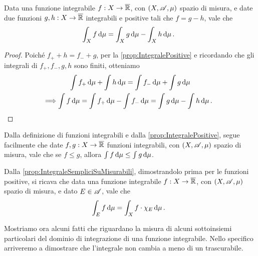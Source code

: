 \begin{lemma}\label{lemma:DefinizioneEquivalenteIntegraleIntegrabili}
	Data una funzione integrabile $f:X\to\overline{\mathbb R}$, con $(X,\mathscr A,\mu)$ spazio di misura, e date due funzioni $g,h:X\to \overline{\mathbb R}$ integrabili e positive tali che $f=g-h$, vale che
	\begin{equation*}
		\int_X f\,\mathrm d\mu=\int_Xg\,\mathrm d\mu-\int_Xh\,\mathrm d\mu\, \text{. }
	\end{equation*}
\end{lemma}
\begin{proof}
	Poiché $f_++h=f_-+g$, per la \cref{prop:IntegralePositive} e ricordando che gli integrali di $f_+,f_-,g,h$ sono finiti, otteniamo
	\begin{gather*}
		\int  f_+\,\mathrm d\mu+\int  h\,\mathrm d\mu=\int  f_-\,\mathrm d\mu+\int  g\,\mathrm d\mu \\
		\Longrightarrow \int f\,\mathrm d\mu=\int f_+\,\mathrm d\mu-\int f_-\,\mathrm d\mu=\int g\,\mathrm d\mu-\int h\,\mathrm d\mu\, \text{. }
	\end{gather*}
\end{proof}



\begin{remark}\label{nota:MonotoniaIntegraleIntegrabili}
	Dalla definizione di funzioni integrabili e dalla \cref{prop:IntegralePositive}, segue facilmente che date $f,g:X\to\overline{\mathbb R}$ funzioni integrabili, con $(X,\mathscr A,\mu)$ spazio di misura, vale che se $f\le g$, allora $\int f\,\mathrm d\mu\le \int g\,\mathrm d\mu$.
\end{remark}

\begin{remark}\label{nota:IntegraleIntegrabiliSuMisurabili}
	Dalla \cref{prop:IntegraleSempliciSuMisurabili}, dimostrandolo prima per le funzioni positive, si ricava che data una funzione integrabile $f:X\to\overline{\mathbb R}$, con $(X,\mathscr A,\mu)$ spazio di misura, e dato $E\in\mathscr A$, vale che
	\begin{equation*}
		\int_E f \,\mathrm d\mu=\int_X f\cdot\chi_E\,\mathrm d\mu\, \text{. }
	\end{equation*}

\end{remark}


Mostriamo ora alcuni fatti che riguardano la misura di alcuni sottoinsiemi particolari del dominio di integrazione di una funzione integrabile. Nello specifico arriveremo a dimostrare che l'integrale non cambia a meno di un trascurabile.


